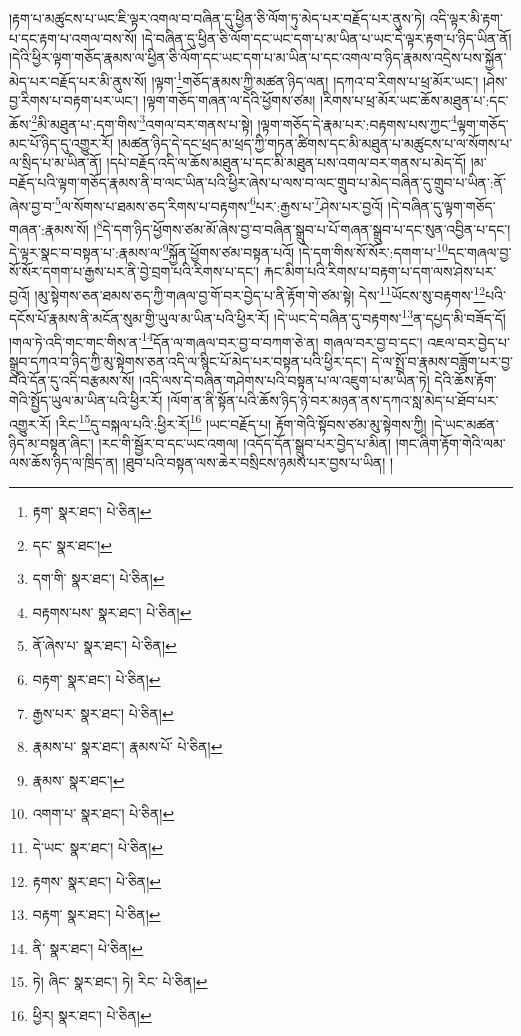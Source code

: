 །རྟག་པ་མཚུངས་པ་ཡང་ཇི་ལྟར་འགལ་བ་བཞིན་དུ་ཕྱིན་ཅི་ལོག་ཏུ་མེད་པར་བརྗོད་པར་ནུས་ཏེ། འདི་ལྟར་མི་རྟག་པ་དང་རྟག་པ་འགལ་བས་སོ། །དེ་བཞིན་དུ་ཕྱིན་ཅི་ལོག་དང་ཡང་དག་པ་མ་ཡིན་པ་ཡང་དེ་ལྟར་རྟག་པ་ཉིད་ཡིན་ནོ། །དེའི་ཕྱིར་ལྟག་གཅོད་རྣམས་ལ་ཕྱིན་ཅི་ལོག་དང་ཡང་དག་པ་མ་ཡིན་པ་དང་འགལ་བ་ཉིད་རྣམས་འདྲེས་པས་སྐྱོན་མེད་པར་བརྗོད་པར་མི་ནུས་སོ། །ལྟག་\footnote{རྟག་  སྣར་ཐང་།  པེ་ཅིན། }གཅོད་རྣམས་ཀྱི་མཚན་ཉིད་ལན། །དཀའ་བ་རིགས་པ་ཕྲ་མོར་ཡང་། །ཤེས་བྱ་རིགས་པ་བརྟག་པར་ཡང་། །ལྟག་གཅོད་གཞན་ལ་དེའི་ཕྱོགས་ཙམ། །རིགས་པ་ཕྲ་མོར་ཡང་ཆོས་མཐུན་པ་:དང་ཆོས་\footnote{དང་  སྣར་ཐང་། }མི་མཐུན་པ་:དག་གིས་\footnote{དག་གི་  སྣར་ཐང་།  པེ་ཅིན། }འགལ་བར་གནས་པ་སྟེ། །ལྟག་གཅོད་དེ་རྣམ་པར་:བརྟགས་པས་ཀྱང་\footnote{བརྟགས་པས་  སྣར་ཐང་།  པེ་ཅིན། }ལྟག་གཅོད་མང་པོ་ཉིད་དུ་འགྱུར་རོ། །མཚན་ཉིད་དེ་དང་ཕྲད་མ་ཕྲད་ཀྱི་གཏན་ཚིགས་དང་མི་མཐུན་པ་མཚུངས་པ་ལ་སོགས་པ་ལ་སྲིད་པ་མ་ཡིན་ནོ། །དཔེ་བརྗོད་འདི་ལ་ཆོས་མཐུན་པ་དང་མི་མཐུན་པས་འགལ་བར་གནས་པ་མེད་དོ། །མ་བརྗོད་པའི་ལྟག་གཅོད་རྣམས་ནི་བ་ལང་ཡིན་པའི་ཕྱིར་ཞེས་པ་ལས་བ་ལང་གྲུབ་པ་མེད་བཞིན་དུ་གྲུབ་པ་ཡིན་:ནོ་ཞེས་བྱ་བ་\footnote{ནོ་ཞེས་པ་  སྣར་ཐང་།  པེ་ཅིན། }ལ་སོགས་པ་ཐམས་ཅད་རིགས་པ་བརྟགས་\footnote{བརྟག་  སྣར་ཐང་།  པེ་ཅིན། }པར་:རྒྱས་པ་\footnote{རྒྱས་པར་  སྣར་ཐང་།  པེ་ཅིན། }ཤེས་པར་བྱའོ། །དེ་བཞིན་དུ་ལྟག་གཅོད་གཞན་:རྣམས་སོ། །\footnote{རྣམས་པ་  སྣར་ཐང་། རྣམས་པོ་  པེ་ཅིན། }དེ་དག་ཉིད་ཕྱོགས་ཙམ་མོ་ཞེས་བྱ་བ་བཞིན་སྒྲུབ་པ་པོ་གཞན་སྒྲུབ་པ་དང་སུན་འབྱིན་པ་དང་། དེ་ལྟར་སྣང་བ་བསྟན་པ་:རྣམས་ལ་\footnote{རྣམས་  སྣར་ཐང་། }སྐྱོན་ཕྱོགས་ཙམ་བསྟན་པའོ། །དེ་དག་གིས་སོ་སོར་:དགག་པ་\footnote{འགག་པ་  སྣར་ཐང་།  པེ་ཅིན། }དང་གཞལ་བྱ་སོ་སོར་དགག་པ་རྒྱས་པར་ནི་བྱེ་བྲག་པའི་རིགས་པ་དང་། རྐང་མིག་པའི་རིགས་པ་བརྟག་པ་དག་ལས་ཤེས་པར་བྱའོ། །མུ་སྟེགས་ཅན་ཐམས་ཅད་ཀྱི་གཞལ་བྱ་གོ་བར་བྱེད་པ་ནི་རྟོག་གེ་ཙམ་སྟེ། དེས་\footnote{དེ་ཡང་  སྣར་ཐང་།  པེ་ཅིན། }ཡོངས་སུ་བརྟགས་\footnote{རྟགས་  སྣར་ཐང་།  པེ་ཅིན། }པའི་དངོས་པོ་རྣམས་ནི་མངོན་སུམ་གྱི་ཡུལ་མ་ཡིན་པའི་ཕྱིར་རོ། །དེ་ཡང་དེ་བཞིན་དུ་བརྟགས་\footnote{བརྟག་  སྣར་ཐང་།  པེ་ཅིན། }ན་དཔྱད་མི་བཟོད་དོ། །གལ་ཏེ་འདི་གང་གང་གིས་ན་\footnote{ནི་  སྣར་ཐང་།  པེ་ཅིན། }དོན་ལ་གཞལ་བར་བྱ་བ་བཀག་ཅེ་ན། གཞལ་བར་བྱ་བ་དང་། འཇལ་བར་བྱེད་པ་སྒྲུབ་དཀའ་བ་ཉིད་ཀྱི་མུ་སྟེགས་ཅན་འདི་ལ་སྙིང་པོ་མེད་པར་བསྟན་པའི་ཕྱིར་དང་། དེ་ལ་སྤྲོ་བ་རྣམས་བཟློག་པར་བྱ་བའི་དོན་དུ་འདི་བརྩམས་སོ། །འདི་ལས་དེ་བཞིན་གཤེགས་པའི་བསྟན་པ་ལ་འཇུག་པ་མ་ཡིན་ཏེ། དེའི་ཆོས་རྟོག་གེའི་སྤྱོད་ཡུལ་མ་ཡིན་པའི་ཕྱིར་རོ། །ལོག་ན་ནི་སྟོན་པའི་ཆོས་ཉིད་ཉེ་བར་མཉན་ནས་དཀའ་སླ་མེད་པ་ཐོབ་པར་འགྱུར་རོ། །རིང་\footnote{ཏེ། ཞིང་  སྣར་ཐང་། ཏེ། རིང་  པེ་ཅིན། }དུ་བསྐལ་པའི་:ཕྱིར་རོ།\footnote{ཕྱིར།  སྣར་ཐང་།  པེ་ཅིན། } །ཡང་བརྗོད་པ། རྟོག་གེའི་སྟོབས་ཙམ་མུ་སྟེགས་ཀྱི། །དེ་ཡང་མཚན་ཉིད་མ་བསྟན་ཞིང་། །རང་གི་སྦྱོར་བ་དང་ཡང་འགལ། །འདོད་དོན་སྒྲུབ་པར་བྱེད་པ་མིན། །གང་ཞིག་རྟོག་གེའི་ལམ་ལས་ཆོས་ཉིད་ལ་ཁྲིད་ན། །ཐུབ་པའི་བསྟན་ལས་ཆེར་བསྲིངས་ཉམས་པར་བྱས་པ་ཡིན། །

